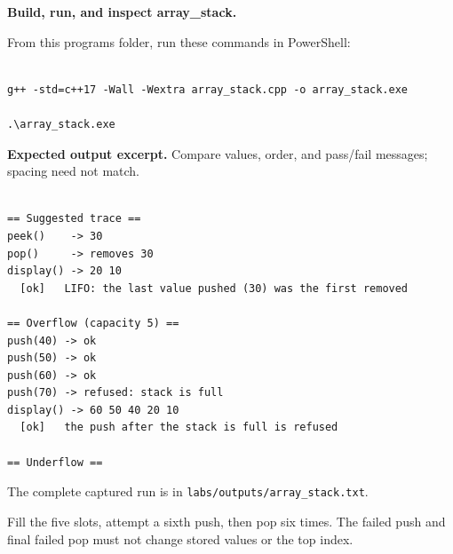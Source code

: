 \textbf{Build, run, and inspect array\_stack.}

From this program\textquotesingle s folder, run these commands in PowerShell:

\begin{lstlisting}[style=utpterminal,language={}]

g++ -std=c++17 -Wall -Wextra array_stack.cpp -o array_stack.exe

.\array_stack.exe

\end{lstlisting}

\textbf{Expected output excerpt.} Compare values, order, and pass/fail messages; spacing need not match.

\begin{lstlisting}[style=utpterminal,language={}]

== Suggested trace ==
peek()    -> 30
pop()     -> removes 30
display() -> 20 10 
  [ok]   LIFO: the last value pushed (30) was the first removed

== Overflow (capacity 5) ==
push(40) -> ok
push(50) -> ok
push(60) -> ok
push(70) -> refused: stack is full
display() -> 60 50 40 20 10 
  [ok]   the push after the stack is full is refused

== Underflow ==

\end{lstlisting}

The complete captured run is in \texttt{labs/outputs/array\_stack.txt}.

\begin{tryit}

Fill the five slots, attempt a sixth push, then pop six times. The failed push and final failed pop must not change stored values or the top index.

\end{tryit}
